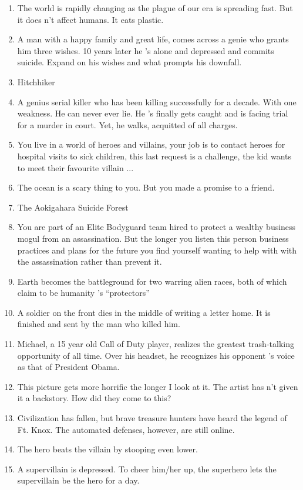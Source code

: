 \begin{enumerate}[noitemsep]
    \item The world is rapidly changing as the plague of our era is spreading fast. But it does n't affect humans. It eats plastic.
    \item A man with a happy family and great life, comes across a genie who grants him three wishes. 10 years later he 's alone and depressed and commits suicide. Expand on his wishes and what prompts his downfall.
    \item Hitchhiker
    \item A genius serial killer who has been killing successfully for a decade. With one weakness. He can never ever lie. He 's finally gets caught and is facing trial for a murder in court. Yet, he walks, acquitted of all charges.
    \item You live in a world of heroes and villains, your job is to contact heroes for hospital visits to sick children, this last request is a challenge, the kid wants to meet their favourite villain ...
    \item The ocean is a scary thing to you. But you made a promise to a friend.
    \item The Aokigahara Suicide Forest
    \item You are part of an Elite Bodyguard team hired to protect a wealthy business mogul from an assassination. But the longer you listen this person business practices and plans for the future you find yourself wanting to help with with the assassination rather than prevent it.
    \item Earth becomes the battleground for two warring alien races, both of which claim to be humanity 's “protectors”
    \item A soldier on the front dies in the middle of writing a letter home. It is finished and sent by the man who killed him.
    \item Michael, a 15 year old Call of Duty player, realizes the greatest trash-talking opportunity of all time. Over his headset, he recognizes his opponent 's voice as that of President Obama.
    \item This picture gets more horrific the longer I look at it. The artist has n't given it a backstory. How did they come to this?
    \item Civilization has fallen, but brave treasure hunters have heard the legend of Ft. Knox. The automated defenses, however, are still online.
    \item The hero beats the villain by stooping even lower.
    \item A supervillain is depressed. To cheer him/her up, the superhero lets the supervillain be the hero for a day.

\end{enumerate}
